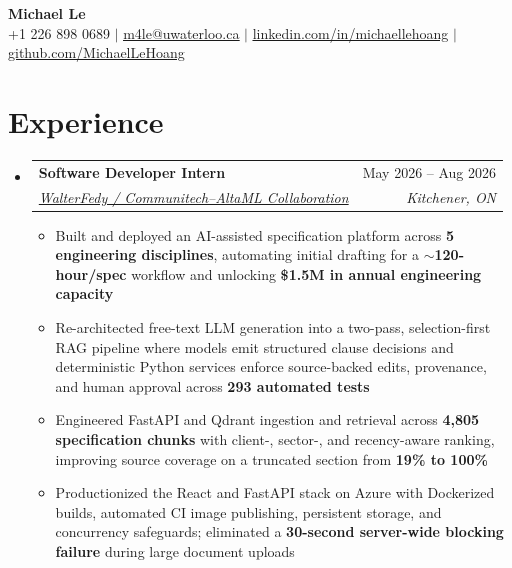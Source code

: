\documentclass[letterpaper,10pt]{article}
\makeatletter
\newcommand{\resumeItem}[1]{
  \item\small{
    {#1 \vspace{-2pt}}
  }
}
\newcommand{\resumeSubheading}[4]{
  \vspace{-2pt}\item
    \begin{tabular*}{0.97\textwidth}[t]{l@{\extracolsep{\fill}}r}
      \textbf{#1} & #2 \\
      \textit{\small#3} & \textit{\small #4} \\
    \end{tabular*}\vspace{-7pt}
}
\newcommand{\resumeSubHeadingListStart}{\begin{itemize}[leftmargin=0.15in, label={}]}
\newcommand{\resumeSubHeadingListEnd}{\end{itemize}}
\newcommand{\resumeItemListStart}{\begin{itemize}}
\newcommand{\resumeItemListEnd}{\end{itemize}\vspace{-5pt}}
\newcommand{\resumeSectionGap}{\vspace{-8pt}}
\newif\ifeducationfirst
\newcommand{\resumeEducationSection}{%
  \section{Education}
  \resumeSubHeadingListStart
    \resumeSubheading
      {University of Waterloo}{Waterloo, ON}
      {Honours Bachelor of Mathematics, Major in Statistics}{Sep 2023 -- Expected Aug 2028}
      \small{
        \item
          {\textbf{Coursework}{: Data Structures and Algorithms, Object-Oriented Software Development, Probability and Statistics, Combinatorics and Optimization} } }

  \resumeSubHeadingListEnd
}
\newcommand{\resumeTechnicalSkillsSection}{%
  \section{Technical Skills}
  \begin{itemize}[leftmargin = 0.15in, label={}]
    \small{\item{
      \textbf{Languages}{: Python, TypeScript, JavaScript, SQL, C/C++, Bash} \\
      \textbf{Frameworks \& Libraries}{: FastAPI, React, Next.js, PyTorch, TensorFlow, scikit-learn, OpenCV, Pandas, NumPy, LangChain}\\
      \textbf{Data \& Cloud}{: PostgreSQL, Qdrant, Azure Container Apps, Microsoft Graph, Azure OpenAI, AWS (SageMaker, S3, EC2)}\\
      \textbf{Tools \& Concepts}{: Docker, Git, GitHub Actions, pytest, CI/CD, REST APIs}
    }}
  \end{itemize}
}
\makeatother
\begin{document}

\begin{center}
    {\Huge\bfseries Michael Le} \\ \vspace{1pt}
    \small +1 226 898 0689 $|$ \href{mailto:m4le@uwaterloo.ca}{\underline{m4le@uwaterloo.ca}} $|$
    \href{https://www.linkedin.com/in/michaellehoang/}{\underline{linkedin.com/in/michaellehoang}}
    $|$
    \href{https://github.com/MichaelLeHoang}{\underline{github.com/MichaelLeHoang}}
\end{center}



\vspace{-15pt}
\ifeducationfirst
  \resumeEducationSection
  \resumeSectionGap
  \resumeTechnicalSkillsSection
  \resumeSectionGap
\fi
\section{Experience}
\resumeSubHeadingListStart
  \resumeSubheading
  {Software Developer Intern}{May 2026 -- Aug 2026}
  {\href{https://www.walterfedy.com/}{WalterFedy / Communitech--AltaML Collaboration}}{Kitchener, ON}
  \resumeItemListStart
    \resumeItem{Built and deployed an AI-assisted specification platform across \textbf{5 engineering disciplines}, automating initial drafting for a \textbf{${\sim}$120-hour/spec} workflow and unlocking \textbf{\$1.5M in annual engineering capacity}}
    \resumeItem{Re-architected free-text LLM generation into a two-pass, selection-first RAG pipeline where models emit structured clause decisions and deterministic Python services enforce source-backed edits, provenance, and human approval across \textbf{293 automated tests}}
    \resumeItem{Engineered FastAPI and Qdrant ingestion and retrieval across \textbf{4,805 specification chunks} with client-, sector-, and recency-aware ranking, improving source coverage on a truncated section from \textbf{19\% to 100\%}}
    \resumeItem{Productionized the React and FastAPI stack on Azure with Dockerized builds, automated CI image publishing, persistent storage, and concurrency safeguards; eliminated a \textbf{30-second server-wide blocking failure} during large document uploads}
  \resumeItemListEnd
 \resumeSubHeadingListEnd
\end{document}
